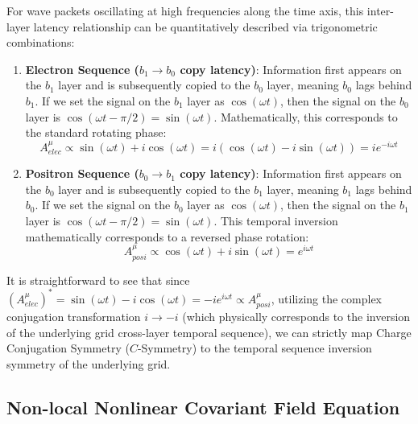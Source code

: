 \documentclass[12pt, a4paper]{article}
\begin{document}
For wave packets oscillating at high frequencies along the time axis, this inter-layer latency relationship can be quantitatively described via trigonometric combinations:
\begin{enumerate}
    \item \textbf{Electron Sequence ($b_1 \to b_0$ copy latency)}:  
    Information first appears on the $b_1$ layer and is subsequently copied to the $b_0$ layer, meaning $b_0$ lags behind $b_1$. If we set the signal on the $b_1$ layer as $\cos(\omega t)$, then the signal on the $b_0$ layer is $\cos(\omega t - \pi/2) = \sin(\omega t)$. Mathematically, this corresponds to the standard rotating phase:
    \begin{equation}
    A^\mu_{elec} \propto \sin(\omega t) + i \cos(\omega t) = i \left( \cos(\omega t) - i \sin(\omega t) \right) = i e^{-i\omega t} \label{eq:A_elec}
    \end{equation}
    
    \item \textbf{Positron Sequence ($b_0 \to b_1$ copy latency)}:  
    Information first appears on the $b_0$ layer and is subsequently copied to the $b_1$ layer, meaning $b_1$ lags behind $b_0$. If we set the signal on the $b_0$ layer as $\cos(\omega t)$, then the signal on the $b_1$ layer is $\cos(\omega t - \pi/2) = \sin(\omega t)$. This temporal inversion mathematically corresponds to a reversed phase rotation:
    \begin{equation}
    A^\mu_{posi} \propto \cos(\omega t) + i \sin(\omega t) = e^{i\omega t} \label{eq:A_posi}
    \end{equation}
\end{enumerate}

It is straightforward to see that since $(A^\mu_{elec})^* = \sin(\omega t) - i \cos(\omega t) = -i e^{i\omega t} \propto A^\mu_{posi}$, utilizing the complex conjugation transformation $i \to -i$ (which physically corresponds to the inversion of the underlying grid cross-layer temporal sequence), we can strictly map Charge Conjugation Symmetry ($C$-Symmetry) to the temporal sequence inversion symmetry of the underlying grid.

\subsection{Non-local Nonlinear Covariant Field Equation}
\end{document}

